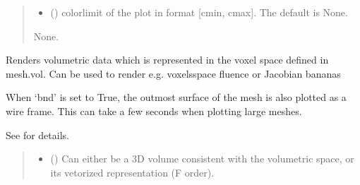 \documentclass[letterpaper,10pt,english]{sphinxmanual}
\begin{document}
\begin{fulllineitems}
\begin{fulllineitems}
\begin{quote}
\begin{description}
\begin{itemize}
\item {} 
\sphinxAtStartPar
{} (\sphinxstyleliteralemphasis{\sphinxupquote{, }}) \textendash{} colorlimit of the plot in format {[}cmin, cmax{]}. The default is None.

\end{itemize}

\sphinxAtStartPar
None.

\end{description}\end{quote}

\end{fulllineitems}


\begin{fulllineitems}
\label{\detokenize{_autosummary/nirfasterff.base.fluor_mesh.fluormesh:nirfasterff.base.fluor_mesh.fluormesh.plotvol}}
\pysigstartsignatures
\pysiglinewithargsret
{}
{\sphinxparamcomma {}\sphinxparamcomma {}\sphinxparamcomma {}\sphinxparamcomma {}\sphinxparamcomma {}}
{}
\pysigstopsignatures
\sphinxAtStartPar
Renders volumetric data which is represented in the voxel space defined in mesh.vol.
Can be used to render e.g. voxels\sphinxhyphen{}space fluence or Jacobian bananas

\sphinxAtStartPar
When ‘bnd’ is set to True, the outmost surface of the mesh is also plotted as a wire frame.
This can take a few seconds when plotting large meshes.

\sphinxAtStartPar
See {\hyperref[\detokenize{_autosummary/nirfasterff.visualize.plotvol:nirfasterff.visualize.plotvol}]{}} for details.
\begin{quote}\begin{description}
\begin{itemize}
\item {} 
\sphinxAtStartPar
{} () \textendash{} Can either be a 3D volume consistent with the volumetric space, or its vetorized representation (F order).


\end{itemize}
\end{description}
\end{quote}
\end{fulllineitems}
\end{fulllineitems}
\end{document}
